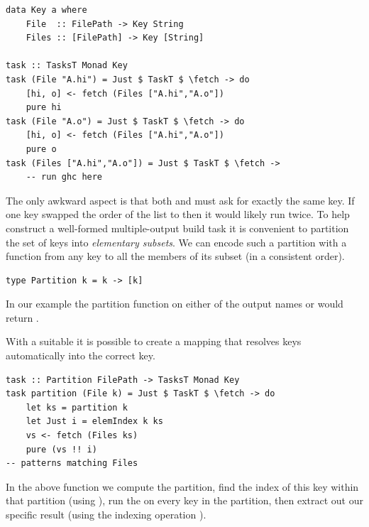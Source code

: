 \vspace{1mm}
\begin{verbatim}
data Key a where
    File  :: FilePath -> Key String
    Files :: [FilePath] -> Key [String]

task :: TasksT Monad Key
task (File "A.hi") = Just $ TaskT $ \fetch -> do
    [hi, o] <- fetch (Files ["A.hi","A.o"])
    pure hi
task (File "A.o") = Just $ TaskT $ \fetch -> do
    [hi, o] <- fetch (Files ["A.hi","A.o"])
    pure o
task (Files ["A.hi","A.o"]) = Just $ TaskT $ \fetch ->
    -- run ghc here
\end{verbatim}
\vspace{1mm}

The only awkward aspect is that both  and  must ask for exactly the same
 key. If one  key swapped the order of the list to  then it would likely
run  twice. To help construct a well-formed multiple-output build task
it is convenient to partition the set of keys into \emph{elementary subsets}.
We can encode such a partition with a function from any key to all the members of its
subset (in a consistent order).

\vspace{1mm}
\begin{verbatim}
type Partition k = k -> [k]
\end{verbatim}
\vspace{1mm}

\noindent In our example the partition function on either of the output names  or  would
return \hs{["A.hi", "A.o"]}.

With a suitable  it is possible to create a mapping that resolves 
keys automatically into the correct  key.

\vspace{1mm}
\begin{verbatim}
task :: Partition FilePath -> TasksT Monad Key
task partition (File k) = Just $ TaskT $ \fetch -> do
    let ks = partition k
    let Just i = elemIndex k ks
    vs <- fetch (Files ks)
    pure (vs !! i)
-- patterns matching Files
\end{verbatim}
\vspace{1mm}

In the above function we compute the partition, find the index of this key within that
partition (using ), run the  on every key in the partition,
then extract out our specific result (using the indexing operation \hs{!!}).

